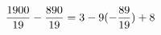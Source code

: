 \documentclass[preview]{standalone}
\begin{document}
\begin{align*}
\special{dvisvgm:raw <g id='unique000'>}\frac{1900}{19} - \frac{890}{19} = 3 - 9 (- \frac{89}{19}) + 8\special{dvisvgm:raw </g>}
\end{align*}
\end{document}
